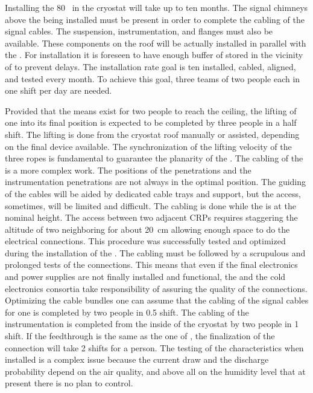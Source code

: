 Installing the 80~ in the cryostat will take up to ten months.
The signal chimneys above the  being installed must be present in order to complete the cabling of the signal cables.
The suspension, instrumentation, and  flanges must also be available.
These components on the roof will be actually installed in parallel with the .
For installation it is foreseen to have enough buffer of  stored in the vicinity of  to prevent delays.
The installation rate goal is  ten  installed, cabled, aligned, %
and tested every month.
To achieve this goal, three teams of two people each in one shift per day are needed.

Provided that the means exist  for two people to reach the ceiling, the lifting of one  into its final position is expected to be completed by three people in a half shift. %
The lifting is done from the cryostat roof manually or assisted, depending on the final device available.
The synchronization of the lifting velocity of the three ropes is fundamental to guarantee the planarity of the .
The cabling of the  is a more complex work.
The positions of the  penetrations and the   instrumentation penetrations are not always in the optimal position.
The guiding of the cables will be aided by dedicated cable trays and support, but the access, sometimes, will be limited and difficult.
The cabling is done while the  is at the nominal height.
The access between two adjacent CRPs requires staggering the altitude of two neighboring  for about 20~cm allowing enough space to do the electrical connections.
This procedure was successfully tested and optimized during the installation of the .
The cabling must be followed by a scrupulous and prolonged tests of the connections.
%
This means that even if the final electronics and power supplies are not finally installed and functional, the  and the cold electronics consortia take responsibility of assuring the quality of the connections. 
Optimizing the cable bundles one can assume that the cabling of the signal cables for one  is completed by two people in 0.5 shift.
The cabling of the  instrumentation is completed from the inside of the cryostat by two people in 1 shift.
If the   feedthrough is the same as the one of , the finalization of the connection will take 2 shifts for a person.
The testing of the   characteristics when installed is a complex issue because the current draw and the discharge probability depend on the air quality, and above all on the humidity level that at present there is no plan to control.
